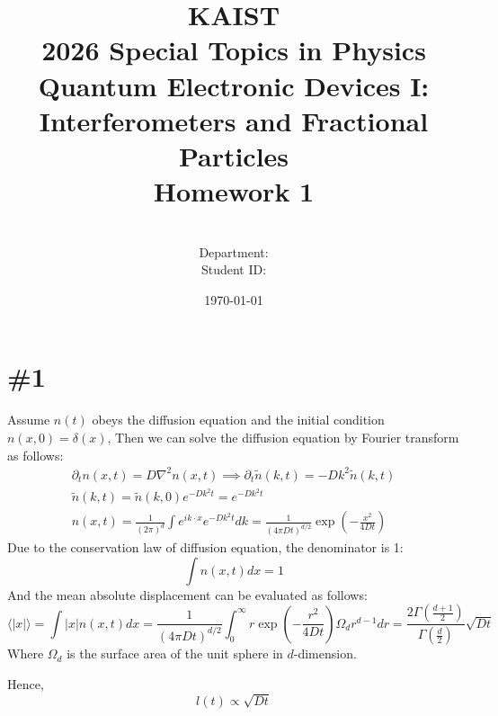 \documentclass[a4paper,11pt]{article}
\title{KAIST\\2026 Special Topics in Physics Quantum Electronic Devices I: Interferometers and Fractional Particles\\
Homework 1\bigskip}
\author{\textbf{\Large \name} \\
Department: \department\\
Student ID: \studentid}
\date{\today}
\begin{document}
\thispagestyle{empty}
\maketitle
\tableofcontents
{}

\newcommand{\tr}{\operatorname{tr}}
\newcommand{\sgn}{\operatorname{sgn}}
\newcommand{\supp}{\operatorname{supp}}
\renewcommand{\Re}{\operatorname{Re}}
\renewcommand{\Im}{\operatorname{Im}}
\newcommand{\boltz}{k_{\mathrm{B}}}

\section{\#1}

Assume $n(t)$ obeys the diffusion equation and the initial condition $n(x,0) = \delta(x)$, Then we can solve the diffusion equation by Fourier transform as follows:
\begin{gather}
    \partial_t n(x, t) = D \nabla^2 n(x, t) \implies \partial_t \tilde{n}(k, t) = -D k^2 \tilde{n}(k, t) \\
    \tilde{n}(k, t) = \tilde{n}(k, 0) e^{-D k^2 t} = e^{-D k^2 t} \\
    n(x,t) = \frac{1}{(2\pi)^d}\int e^{ik\cdot x} e^{-Dk^2 t} dk= \frac{1}{(4\pi Dt)^{d/2}} \exp\left(-\frac{x^2}{4Dt}\right)
\end{gather}
Due to the conservation law of diffusion equation, the denominator is 1:
\begin{equation}
    \int n(x,t) dx = 1
\end{equation}
And the mean absolute displacement can be evaluated as follows:
\begin{equation}
    \langle |x| \rangle = \int |x| n(x,t) dx = \frac{1}{(4\pi Dt)^{d/2}} \int_0^\infty r \exp\left(-\frac{r^2}{4Dt}\right) \Omega_d r^{d-1} dr = \frac{2 \Gamma(\frac{d+1}{2})}{\Gamma(\frac{d}{2})} \sqrt{Dt}
\end{equation}
Where $\Omega_d$ is the surface area of the unit sphere in $d$-dimension.

Hence,
\begin{equation}
    l(t) \propto \sqrt{Dt}
\end{equation}
\end{document}
